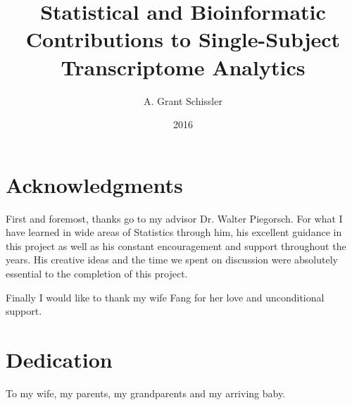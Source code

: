 \documentclass[final]{ua-thesis}
\author{A. Grant Schissler}
\title{Statistical and Bioinformatic Contributions to Single-Subject Transcriptome Analytics}
\date{2016}
\numberwithin{equation}{section}
\begin{document}
\maketitle

\chapter*{Acknowledgments}
First and foremost, thanks go to my advisor Dr. Walter Piegorsch. For what I have learned in wide areas of Statistics through him, his excellent guidance in this project as well as his constant encouragement and support throughout the years. His creative ideas and the time we spent on discussion were absolutely essential to the completion of this project.
%
%
%

Finally I would like to thank my wife Fang for her love and unconditional support.

\chapter*{Dedication}
\thispagestyle{topright}
\begin{center}To my wife, my parents, my grandparents and my arriving baby.\end{center}
\end{document}
